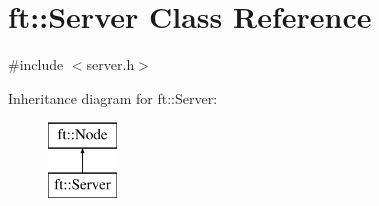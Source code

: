 \hypertarget{classft_1_1Server}{}\section{ft\+:\+:Server Class Reference}
\label{classft_1_1Server}


{\ttfamily \#include $<$server.\+h$>$}

Inheritance diagram for ft\+:\+:Server\+:\begin{figure}[H]
\begin{center}
\leavevmode
\includegraphics[height=2.000000cm]{classft_1_1Server}
\end{center}
\end{figure}
